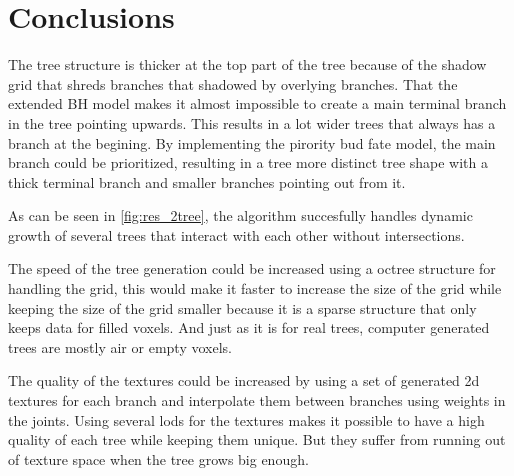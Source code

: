 \documentclass[11pt]{article} %
\begin{document}
\section{Conclusions}
The tree structure is thicker at the top part of the tree because of the shadow grid that shreds branches that shadowed by overlying branches.
That the extended BH model makes it almost impossible to create a main terminal branch in the tree pointing upwards.
This results in a lot wider trees that always has a branch at the begining.
By implementing the pirority bud fate model, the main branch could be prioritized, resulting in a tree more distinct tree shape with a thick terminal branch and smaller branches pointing out from it.

As can be seen in \autoref{fig:res_2tree}, the algorithm succesfully handles dynamic growth of several trees that interact with each other without intersections.

The speed of the tree generation could be increased using a octree structure for handling the grid, this would make it faster to increase the size of the grid while keeping the size of the grid smaller because it is a sparse structure that only keeps data for filled voxels.
And just as it is for real trees, computer generated trees are mostly air or empty voxels.

The quality of the textures could be increased by using a set of generated 2d textures for each branch and interpolate them between branches using weights in the joints.
Using several lods for the textures makes it possible to have a high quality of each tree while keeping them unique.
But they suffer from running out of texture space when the tree grows big enough.



\end{document}
